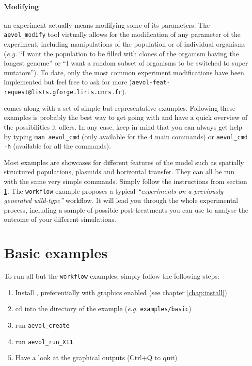 \paragraph{Modifying}an experiment actually means modifying some of its parameters. The \verb?aevol_modify? tool virtually allows for the modification of any parameter of the experiment, including manipulations of the population or of individual organisms (\emph{e.g.} ``I want the population to be filled with clones of the organism having the longest genome'' or ``I want a random subset of organisms to be switched to super mutators''). To date, only the most common experiment modifications have been implemented but feel free to ask for more (\verb?aevol-feat-request@lists.gforge.liris.cnrs.fr?).



\aevol{} comes along with a set of simple but representative examples. Following these examples is probably the best way to get going with \aevol{} and have a quick overview of the possibilities it offers. In any case, keep in mind that you can always get help by typing \verb?man aevol_cmd? (only available for the 4 main commands) or \verb?aevol_cmd -h? (available for all the commands).

Most examples are showcases for different features of the model such as spatially structured populations, plasmids and horizontal transfer. They can all be run with the same very simple commands. Simply follow the instructions from section \ref{sect:basic_examples}.
The \verb?workflow? example proposes a typical \emph{``experiments on a previously generated wild-type''} workflow. It will lead you through the whole experimental process, including a sample of possible post-treatments you can use to analyse the outcome of your different simulations.


\section{Basic examples}
\label{sect:basic_examples}

To run all but the \verb?workflow? examples, simply follow the following steps:

\begin{enumerate}
\item Install \aevol{}, preferentially with graphics enabled (see chapter \ref{chap:install})
\item cd into the directory of the example (\emph{e.g.} \verb?examples/basic?)
\item
run \verb?aevol_create?
\item
run \verb?aevol_run_X11?
\item Have a look at the graphical outputs (Ctrl+Q to quit)
\end{enumerate}



